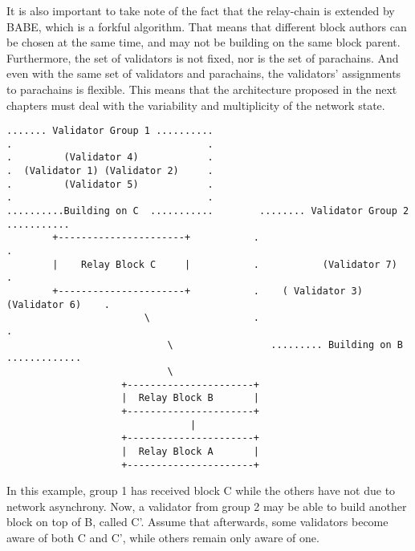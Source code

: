 It is also important to take note of the fact that the relay-chain is extended by BABE, which is a forkful algorithm. That means that different block authors can be chosen at the same time, and may not be building on the same block parent. Furthermore, the set of validators is not fixed, nor is the set of parachains. And even with the same set of validators and parachains, the validators' assignments to parachains is flexible. This means that the architecture proposed in the next chapters must deal with the variability and multiplicity of the network state.

\begin{verbatim}
....... Validator Group 1 ..........
.                                  .
.         (Validator 4)            .
.  (Validator 1) (Validator 2)     .
.         (Validator 5)            .
.                                  .
..........Building on C  ...........        ........ Validator Group 2 ...........
        +----------------------+           .                                    .
        |    Relay Block C     |           .           (Validator 7)            .
        +----------------------+           .    ( Validator 3) (Validator 6)    .
                        \                  .                                    .
                            \                 ......... Building on B  .............
                            \
                    +----------------------+
                    |  Relay Block B       |
                    +----------------------+
                                |
                    +----------------------+
                    |  Relay Block A       |
                    +----------------------+
\end{verbatim}

In this example, group 1 has received block C while the others have not due to network asynchrony. Now, a validator from group 2 may be able to build another block on top of B, called C'. Assume that afterwards, some validators become aware of both C and C', while others remain only aware of one.

